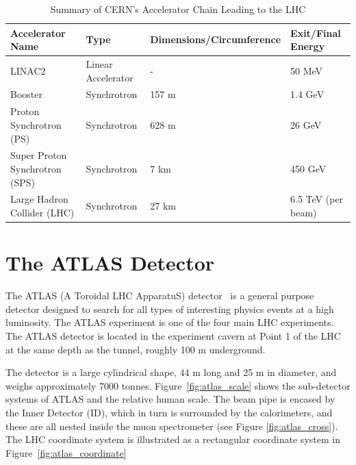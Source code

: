 \begin{table}[ht]
\centering
\begin{adjustbox}{width=0.95\textwidth}
\begin{tabular}{|l|l|l|l|}
\hline
\textbf{Accelerator Name} & \textbf{Type} & \textbf{Dimensions/Circumference} & \textbf{Exit/Final Energy} \\ \hline
LINAC2 & Linear Accelerator & - & 50 MeV \\ \hline
Booster & Synchrotron & 157 m & 1.4 GeV \\ \hline
Proton Synchrotron (PS) & Synchrotron & 628 m & 26 GeV \\ \hline
Super Proton Synchrotron (SPS) & Synchrotron & 7 km & 450 GeV \\ \hline
Large Hadron Collider (LHC) & Synchrotron & 27 km & 6.5 TeV (per beam) \\ \hline
\end{tabular}
\end{adjustbox}
\caption{Summary of CERN's Accelerator Chain Leading to the LHC}
\label{table:accelerators}
\end{table}

\clearpage
\section{The ATLAS Detector}
The ATLAS (A Toroidal LHC ApparatuS) detector~\cite{TheATLASCollaboration_2008} is a general purpose detector designed to search for all types of interesting physics events at a high luminosity. The ATLAS experiment is one of the four main LHC experiments. The ATLAS detector is located in the experiment cavern at Point 1 of the LHC at the same depth as the tunnel, roughly 100 m underground.

The detector is a large cylindrical shape, 44 m long and 25 m in diameter, and weighs approximately 7000 tonnes. Figure~\ref{fig:atlas_scale} shows the sub-detector systems of ATLAS and the relative human scale. The beam pipe is encased by the Inner Detector (ID), which in turn is surrounded by the calorimeters, and these are all nested inside the muon spectrometer (see Figure \ref{fig:atlas_cross}).
The LHC coordinate system is illustrated as a rectangular coordinate system in Figure~\ref{fig:atlas_coordinate}

